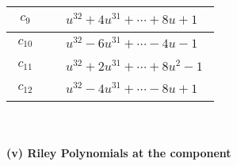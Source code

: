 \documentclass[1p]{elsarticle_modified}
\theoremstyle{definition}
\begin{document}
\begin{tabular}{m{50pt}|m{274pt}}
\hline $$\begin{aligned}c_{9}\end{aligned}$$&$\begin{aligned}
&u^{32}+4 u^{31}+\cdots+8 u+1
\end{aligned}$\\
\hline $$\begin{aligned}c_{10}\end{aligned}$$&$\begin{aligned}
&u^{32}-6 u^{31}+\cdots-4 u-1
\end{aligned}$\\
\hline $$\begin{aligned}c_{11}\end{aligned}$$&$\begin{aligned}
&u^{32}+2 u^{31}+\cdots+8 u^2-1
\end{aligned}$\\
\hline $$\begin{aligned}c_{12}\end{aligned}$$&$\begin{aligned}
&u^{32}-4 u^{31}+\cdots-8 u+1
\end{aligned}$\\
\hline
\end{tabular}\\~\\
\newpage\renewcommand{\arraystretch}{1}
\flushleft \textbf{(v) Riley Polynomials at the component}\newline \\
\end{document}
